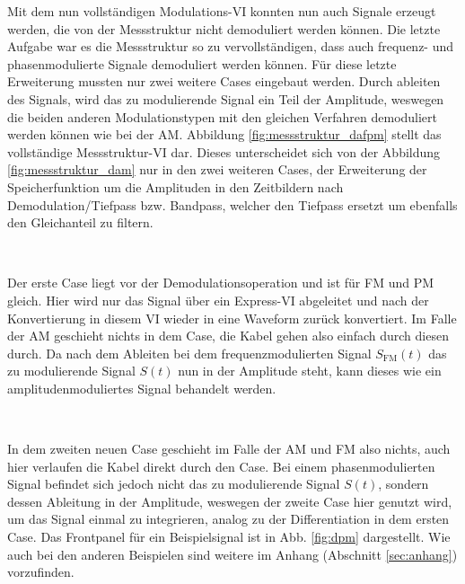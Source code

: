 	\pagestyle{headings}
	Mit dem nun vollständigen Modulations-VI konnten nun auch Signale erzeugt werden, die von der Messstruktur nicht demoduliert werden können.
	Die letzte Aufgabe war es die Messstruktur so zu vervollständigen, dass auch frequenz- und phasenmodulierte Signale demoduliert werden können.
	Für diese letzte Erweiterung mussten nur zwei weitere Cases eingebaut werden.
	Durch ableiten des Signals, wird das zu modulierende Signal ein Teil der Amplitude, weswegen die beiden anderen Modulationstypen mit den gleichen Verfahren demoduliert werden können wie bei der AM.
	Abbildung \ref{fig:messstruktur_dafpm} stellt das vollständige Messstruktur-VI dar.
	Dieses unterscheidet sich von der Abbildung \ref{fig:messstruktur_dam} nur in den zwei weiteren Cases, der Erweiterung der Speicherfunktion um die Amplituden in den Zeitbildern nach Demodulation/Tiefpass bzw. Bandpass, welcher den Tiefpass ersetzt um ebenfalls den Gleichanteil zu filtern.
		
	\
	
	Der erste Case liegt vor der Demodulationsoperation und ist für FM und PM gleich.
	Hier wird nur das Signal über ein Express-VI abgeleitet und nach der Konvertierung in diesem VI wieder in eine Waveform zurück konvertiert.
	Im Falle der AM geschieht nichts in dem Case, die Kabel gehen also einfach durch diesen durch.
	Da nach dem Ableiten bei dem frequenzmodulierten Signal $S_\text{FM}(t)$ das zu modulierende Signal $S(t)$ nun in der Amplitude steht, kann dieses wie ein amplitudenmoduliertes Signal behandelt werden.
		
	\
	
	In dem zweiten neuen Case geschieht im Falle der AM und FM also nichts, auch hier verlaufen die Kabel direkt durch den Case.
	Bei einem phasenmodulierten Signal befindet sich jedoch nicht das zu modulierende Signal $S(t)$, sondern dessen Ableitung in der Amplitude, weswegen der zweite Case hier genutzt wird, um das Signal einmal zu integrieren, analog zu der Differentiation in dem ersten Case.
	Das Frontpanel für ein Beispielsignal ist in Abb. \ref{fig:dpm} dargestellt. 
	Wie auch bei den anderen Beispielen sind weitere im Anhang (Abschnitt \ref{sec:anhang}) vorzufinden.
	
